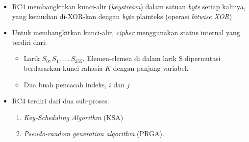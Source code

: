 \documentclass{article}
\begin{document}

\begin{itemize}
    \item RC4 membangkitkan kunci-alir (\textit{keystream}) dalam satuan \textit{byte} setiap kalinya, yang kemudian di-XOR-kan dengan \textit{byte} plainteks (operasi \textit{bitwise XOR})
    \item Untuk membangkitkan kunci-alir, \textit{cipher} menggunakan status internal yang terdiri dari:
    \begin{itemize}
        \item Larik $S_0, S_1, ..., S_{255}$. Elemen-elemen di dalam larik S dipermutasi berdasarkan kunci rahasia $K$ dengan panjang variabel.
        \item Dua buah pencacah indeks, $i$ dan $j$
    \end{itemize}
    \item RC4 terdiri dari dua sub-proses:
    \begin{enumerate}
        \item \textit{Key-Scheduling Algorithm} (KSA)
        \item \textit{Pseudo-random generation algorithm} (PRGA).
    \end{enumerate}
\end{itemize}
\end{document}
